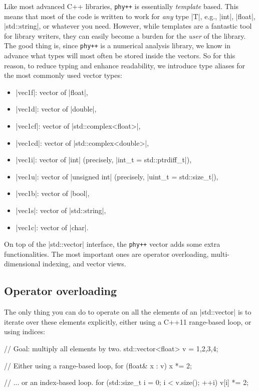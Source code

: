 \documentclass[12pt]{report}
\newcommand{\phypp}{\texttt{phy++}\xspace}
\newcommand{\stdvec}{\cppinline|std::vector|\xspace}
\begin{document}
Like most advanced C++ libraries, \phypp is essentially \emph{template} based. This means that most of the code is written to work for \emph{any} type \cppinline|T|, e.g., \cppinline|int|, \cppinline|float|, \cppinline|std::string|, or whatever you need. However, while templates are a fantastic tool for library writers, they can easily become a burden for the \emph{user} of the library. The good thing is, since \phypp is a numerical analysis library, we know in advance what types will most often be stored inside the vectors. So for this reason, to reduce typing and enhance readability, we introduce type aliases for the most commonly used vector types:
\begin{itemize}
\item \cppinline|vec1f|: vector of \cppinline|float|,
\item \cppinline|vec1d|: vector of \cppinline|double|,
\item \cppinline|vec1cf|: vector of \cppinline|std::complex<float>|,
\item \cppinline|vec1cd|: vector of \cppinline|std::complex<double>|,
\item \cppinline|vec1i|: vector of \cppinline|int| (precisely, \cppinline|int_t = std::ptrdiff_t|),
\item \cppinline|vec1u|: vector of \cppinline|unsigned int| (precisely, \cppinline|uint_t = std::size_t|),
\item \cppinline|vec1b|: vector of \cppinline|bool|,
\item \cppinline|vec1s|: vector of \cppinline|std::string|,
\item \cppinline|vec1c|: vector of \cppinline|char|.
\end{itemize}

On top of the \stdvec interface, the \phypp vector adds some extra functionalities. The most important ones are operator overloading, multi-dimensional indexing, and vector views.

\subsection{Operator overloading \label{SEC:core:overview:overloading}}

The only thing you can do to operate on all the elements of an \stdvec is to iterate over these elements explicitly, either using a C++11 range-based loop, or using indices:
\begin{cppcode}
// Goal: multiply all elements by two.
std::vector<float> v = {1,2,3,4};

// Either using a range-based loop,
for (float& x : v) {
    x *= 2;
}

// ... or an index-based loop.
for (std::size_t i = 0; i < v.size(); ++i) {
    v[i] *= 2;
}
\end{cppcode}
\end{document}
